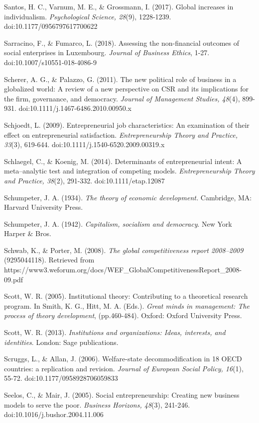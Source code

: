 \documentclass{article}
\begin{document}
Santos, H. C., Varnum, M. E., \& Grossmann, I. (2017). Global increases in individualism. \emph{Psychological Science, 28}(9), 1228-1239. doi:10.1177/0956797617700622

Sarracino, F., \& Fumarco, L. (2018). Assessing the non-financial outcomes of social enterprises in Luxembourg. \emph{Journal of Business Ethics}, 1-27. doi:10.1007/s10551-018-4086-9

Scherer, A. G., \& Palazzo, G. (2011). The new political role of business in a globalized world: A review of a new perspective on CSR and its implications for the firm, governance, and democracy. \emph{Journal of Management Studies, 48}(4), 899-931. doi:10.1111/j.1467-6486.2010.00950.x

Schjoedt, L. (2009). Entrepreneurial job characteristics: An examination of their effect on entrepreneurial satisfaction. \emph{Entrepreneurship Theory and Practice, 33}(3), 619-644. doi:10.1111/j.1540-6520.2009.00319.x

Schlaegel, C., \& Koenig, M. (2014). Determinants of entrepreneurial intent: A meta--analytic test and integration of competing models. \emph{Entrepreneurship Theory and Practice, 38}(2), 291-332. doi:10.1111/etap.12087

Schumpeter, J. A. (1934). \emph{The theory of economic development. }Cambridge, MA: Harvard University Press.

Schumpeter, J. A. (1942). \emph{Capitalism, socialism and democracy}. New York Harper \& Bros.

Schwab, K., \& Porter, M. (2008). \emph{The global competitiveness report 2008--2009} (9295044118). Retrieved from https://www3.weforum.org/docs/WEF\_GlobalCompetitivenessReport\_2008-09.pdf

Scott, W. R. (2005). Institutional theory: Contributing to a theoretical research program. In Smith, K. G., Hitt, M. A. (Eds.). \emph{Great minds in management: The process of theory development}, (pp.460-484). Oxford: Oxford University Press. 

Scott, W. R. (2013). \emph{Institutions and organizations: Ideas, interests, and identities}. London: Sage publications.

Scruggs, L., \& Allan, J. (2006). Welfare-state decommodification in 18 OECD countries: a replication and revision. \emph{Journal of European Social Policy, 16}(1), 55-72. doi:10.1177/0958928706059833

Seelos, C., \& Mair, J. (2005). Social entrepreneurship: Creating new business models to serve the poor. \emph{Business Horizons, 48}(3), 241-246. doi:10.1016/j.bushor.2004.11.006
\end{document}
